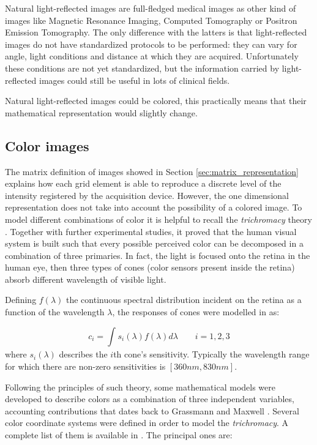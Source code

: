 \documentclass[../main.tex]{subfiles}
\begin{document}
Natural light-reflected images are full-fledged medical images as other kind of images like Magnetic Resonance Imaging, Computed Tomography or Positron Emission Tomography.
The only difference with the latters is that light-reflected images do not have standardized protocols to be performed: they can vary for angle, light conditions and distance at which they are acquired.
Unfortunately these conditions are not yet standardized, but the information carried by light-reflected images could still be useful in lots of clinical fields.

Natural light-reflected images could be colored, this practically means that their mathematical representation would slightly change.

\subsection{Color images}\label{sec:color-images}

The matrix definition of images showed in Section \ref{sec:matrix_representation} explains how each grid element is able to reproduce a discrete level of the intensity registered by the acquisition device. However, the one dimensional representation does not take into account the possibility of a colored image.
To model different combinations of color it is helpful to recall the \textit{trichromacy} theory \cite{young}. Together with further experimental studies, it proved that the human visual system is built such that every possible perceived color can be decomposed in a combination of three primaries. In fact, the light is focused onto the retina in the human eye, then three types of cones (color sensors present inside the retina) absorb different wavelength of visible light.

Defining $f(\lambda)$ the continuous spectral distribution incident on the retina as a function of the wavelength $\lambda$, the responses of cones were modelled in \cite{colors-images} as:

\begin{equation}
   c_{i} = \int_{}^{} s_{i}(\lambda)f(\lambda)d\lambda   \qquad i=1,2,3
\end{equation}
where $s_{i}(\lambda)$ describes the $i$th cone's sensitivity. Typically the wavelength range for which there are non-zero sensitivities is $[360 nm, 830 nm]$.

Following the principles of such theory, some mathematical models were developed to describe colors as a combination of three independent variables, accounting contributions that dates back to Grassmann \cite{grassmann1854theory} and Maxwell \cite{maxwell1856theory}.
Several color coordinate systems were defined in order to model the \textit{trichromacy}. A complete list of them is available in \cite{jain1989fundamentals}. The principal ones are:
\end{document}
